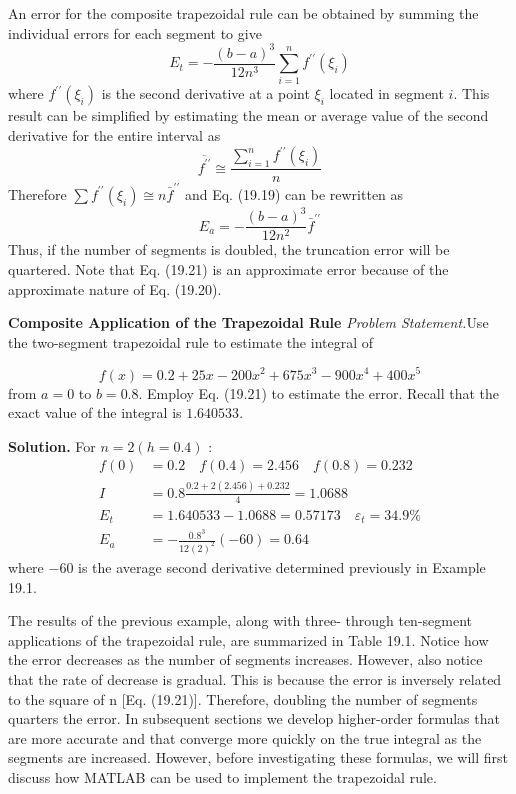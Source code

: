 \documentclass[../main.tex]{subfiles}
\begin{document}
An error for the composite trapezoidal rule can be obtained by summing the individual errors for each segment to give
\begin{equation}
    \tag{19.19}
E_{t}=-\frac{(b-a)^{3}}{12 n^{3}} \sum_{i=1}^{n} f^{\prime \prime}\left(\xi_{i}\right)
\end{equation}
where $f^{\prime \prime}\left(\xi_{i}\right)$ is the second derivative at a point $\xi_{i}$ located in segment $i$. This result can be simplified by estimating the mean or average value of the second derivative for the entire interval as
\begin{equation}
    \tag{19.20}
\overline{f^{\prime \prime}} \cong \frac{\sum_{i=1}^{n} f^{\prime \prime}\left(\xi_{i}\right)}{n}
\end{equation}
Therefore $\sum f^{\prime \prime}\left(\xi_{i}\right) \cong n \bar{f}^{\prime \prime}$ and Eq. (19.19) can be rewritten as
\begin{equation}
    \tag{19.21}
E_{a}=-\frac{(b-a)^{3}}{12 n^{2}} \bar{f}^{\prime \prime}
\end{equation}
Thus, if the number of segments is doubled, the truncation error will be quartered. Note that Eq. (19.21) is an approximate error because of the approximate nature of Eq. (19.20).

\begin{exmp} \textbf{Composite Application of the Trapezoidal Rule}
    \noindent\textit{Problem Statement.}Use the two-segment trapezoidal rule to estimate the integral of
    
	$$
f(x)=0.2+25 x-200 x^{2}+675 x^{3}-900 x^{4}+400 x^{5}
$$
from $a=0$ to $b=0.8$. Employ Eq. (19.21) to estimate the error. Recall that the exact value of the integral is $1.640533$.
	
	\noindent \textbf{Solution.}
	For $n=2(h=0.4)$ :
$$
\begin{aligned}
f(0) &=0.2 \quad f(0.4)=2.456 \quad f(0.8)=0.232 \\
I &=0.8 \frac{0.2+2(2.456)+0.232}{4}=1.0688 \\
E_{t} &=1.640533-1.0688=0.57173 \quad \varepsilon_{t}=34.9 \% \\
E_{a} &=-\frac{0.8^{3}}{12(2)^{2}}(-60)=0.64
\end{aligned}
$$
where $-60$ is the average second derivative determined previously in Example 19.1.
	
\end{exmp}
The results of the previous example, along with three- through ten-segment applications of the trapezoidal rule, are summarized in Table 19.1. Notice how the error decreases
as the number of segments increases. However, also notice that the rate of decrease is gradual. This is because the error is inversely related to the square of n [Eq. (19.21)]. Therefore,
doubling the number of segments quarters the error. In subsequent sections we develop
higher-order formulas that are more accurate and that converge more quickly on the true integral as the segments are increased. However, before investigating these formulas, we will
first discuss how MATLAB can be used to implement the trapezoidal rule.
\end{document}
